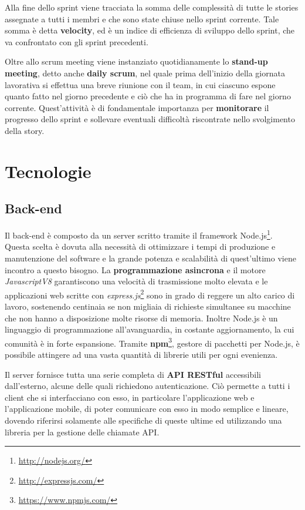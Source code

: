 Alla fine dello sprint viene tracciata la somma delle complessità di tutte le stories assegnate a tutti i membri e che sono state chiuse nello sprint corrente. Tale somma è detta \textbf{velocity}, ed è un indice di efficienza di sviluppo dello sprint, che va confrontato con gli sprint precedenti.

Oltre allo scrum meeting viene instanziato quotidianamente lo \textbf{stand-up meeting}, detto anche \textbf{daily scrum}, nel quale prima dell'inizio della giornata lavorativa si effettua una breve riunione con il team, in cui ciascuno espone quanto fatto nel giorno precedente e ciò che ha in programma di fare nel giorno corrente. Quest'attività è di fondamentale importanza per \textbf{monitorare} il progresso dello sprint e sollevare eventuali difficoltà riscontrate nello svolgimento della story. 

\section{Tecnologie}

\subsection{Back-end}

Il back-end è composto da un server scritto tramite il framework \gls{Node.js}\footnote{\url{http://nodejs.org/}}. Questa scelta è dovuta alla necessità di ottimizzare i tempi di produzione e manutenzione del software e la grande potenza e scalabilità di quest'ultimo viene incontro a questo bisogno. La \textbf{programmazione asincrona} e il motore \textit{JavascriptV8} garantiscono una velocità di trasmissione molto elevata e le applicazioni web scritte con \textit{express.js}\footnote{\url{http://expressjs.com/}} sono in grado di reggere un alto carico di lavoro, sostenendo centinaia se non migliaia di richieste simultanee su macchine che non hanno a disposizione molte risorse di memoria. Inoltre Node.js è un linguaggio di programmazione all'avanguardia, in costante aggiornamento, la cui comunità è in forte espansione. Tramite \textbf{npm}\footnote{\url{https://www.npmjs.com/}}, gestore di pacchetti per Node.js, è possibile attingere ad una vasta quantità di librerie utili per ogni evenienza.

Il server fornisce tutta una serie completa di \textbf{\gls{API} \gls{REST}ful} accessibili dall'esterno, alcune delle quali richiedono autenticazione. Ciò permette a tutti i client che si interfacciano con esso, in particolare l'applicazione web e l'applicazione mobile, di poter comunicare con esso in modo semplice e lineare, dovendo riferirsi solamente alle specifiche di queste ultime ed utilizzando una libreria per la gestione delle chiamate API. 

